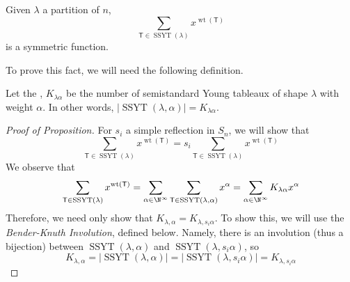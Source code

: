 \documentclass[11pt,leqno,oneside]{amsart}
\numberwithin{thm}{section}
\newcommand{\T}{\mathsf{T}} %
\newcommand{\SSYT}{\operatorname{SSYT}} %
\newcommand{\wt}{\operatorname{wt}}
\begin{document}
\begin{prop}
  Given \(\lambda\) a partition of \(n\), \[
    \sum_{\T \in \SSYT(\lambda)} x^{\wt(\T)}
  \]
  is a symmetric function.
\end{prop}
To prove this fact, we will need the following definition.
\begin{defn}\label{def-kostka-number}
  Let the , \(K_{\lambda \alpha}\) be the number of
  semistandard Young tableaux of shape \(\lambda\) with weight
  \(\alpha\). In other words, \(|\SSYT(\lambda,\alpha)| = K_{\lambda \alpha}\).
\end{defn}
\begin{proof}[Proof of Proposition]
  For \(s_i\) a simple reflection in \(S_n\), we will show that \[
\sum_{\T \in \SSYT(\lambda)} x^{\wt(\T)} = s_i \sum_{\T \in
  \SSYT(\lambda)} x^{\wt(\T)}
  \]
  We observe that \[
    \sum_{\T \in \SSYT(\lambda)} x^{\wt(\T)} = \sum_{\alpha \in \N^\infty}
    \sum_{\T \in \SSYT(\lambda, \alpha)} x^\alpha = \sum_{\alpha \in
      \N^\infty} K_{\lambda \alpha} x^\alpha
  \]
  Therefore, we need only show that \(K_{\lambda, \alpha} =
  K_{\lambda, s_i\alpha}\). To show this, we will use the
  \emph{Bender-Knuth Involution}, defined below. Namely, there is an
  involution (thus a bijection) between \(\SSYT(\lambda,\alpha)\) and
  \(\SSYT(\lambda, s_i \alpha)\), so \[
    K_{\lambda, \alpha} = |\SSYT(\lambda, \alpha)| = |\SSYT(\lambda,
    s_i \alpha)| = K_{\lambda, s_i \alpha}
  \]
\end{proof}
\end{document}
